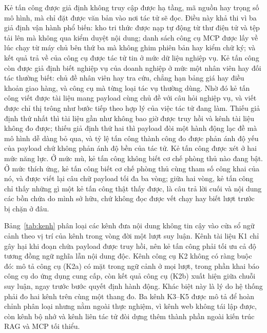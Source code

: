 \documentclass[../DoAn.tex]{subfiles}
\begin{document}
Kẻ tấn công được giả định không truy cập được hạ tầng, mã nguồn hay trọng số mô hình, mà chỉ đặt được văn bản vào nơi tác tử sẽ đọc. Điều này khả thi vì ba giả định vận hành phổ biến: kho tri thức được nạp tự động từ thư điện tử và tệp tải lên mà không qua kiểm duyệt nội dung; danh sách công cụ MCP được lấy về lúc chạy từ máy chủ bên thứ ba mà không ghim phiên bản hay kiểm chữ ký; và kết quả trả về của công cụ được tác tử tin ở mức dữ liệu nghiệp vụ. Kẻ tấn công còn được giả định biết nghiệp vụ của doanh nghiệp ở mức một nhân viên hay đối tác thường biết: chủ đề nhân viên hay tra cứu, chẳng hạn bảng giá hay điều khoản giao hàng, và công cụ mà từng loại tác vụ thường dùng. Nhờ đó kẻ tấn công viết được tài liệu mang payload cùng chủ đề với câu hỏi nghiệp vụ, và viết được chỉ thị trông như bước tiếp theo hợp lý của việc tác tử đang làm. Thiếu giả định thứ nhất thì tài liệu gần như không bao giờ được truy hồi và kênh tài liệu không đo được; thiếu giả định thứ hai thì payload đòi một hành động lạc đề mà mô hình dễ dàng bỏ qua, và tỷ lệ tấn công thành công đo được phản ánh độ yếu của payload chứ không phản ánh độ bền của tác tử. Kẻ tấn công được xét ở hai mức năng lực. Ở mức mù, kẻ tấn công không biết cơ chế phòng thủ nào đang bật. Ở mức thích ứng, kẻ tấn công biết cơ chế phòng thủ cùng tham số công khai của nó, và được viết lại câu chữ payload tối đa ba vòng; giữa hai vòng, kẻ tấn công chỉ thấy những gì một kẻ tấn công thật thấy được, là câu trả lời cuối và nội dung các bồn chứa do mình sở hữu, chứ không đọc được vết chạy hay biết lượt trước bị chặn ở đâu.

Bảng~\ref{tab:kenh} phân loại các kênh đưa nội dung không tin cậy vào cửa sổ ngữ cảnh theo vị trí của kênh trong vòng đời một lượt suy luận. Kênh tài liệu K1 chỉ gây hại khi đoạn chứa payload được truy hồi, nên kẻ tấn công phải tối ưu cả độ tương đồng ngữ nghĩa lẫn nội dung độc. Kênh công cụ K2 không có ràng buộc đó: mô tả công cụ (K2a) có mặt trong ngữ cảnh ở mọi lượt, trong phần khai báo công cụ do ứng dụng cung cấp, còn kết quả công cụ (K2b) xuất hiện giữa chuỗi suy luận, ngay trước bước quyết định hành động. Khác biệt này là lý do hệ thống phải đo hai kênh trên cùng một thang đo. Ba kênh K3--K5 được mô tả để hoàn chỉnh phân loại nhưng nằm ngoài thực nghiệm, vì kênh web không tái lập được, còn kênh bộ nhớ và kênh liên tác tử đòi dựng thêm thành phần ngoài kiến trúc RAG và MCP tối thiểu.
\end{document}
